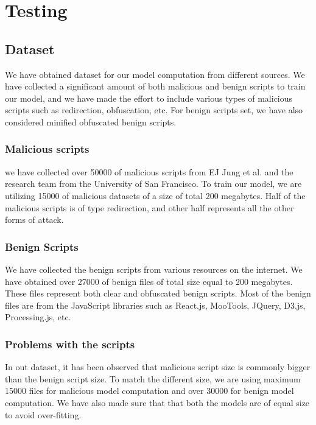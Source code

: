 \chapter{Testing}

\section{Dataset}

We have obtained dataset for our model computation from different sources. We have collected a significant amount of both malicious and benign scripts to train our model, and we have made the effort to include various types of malicious scripts such as redirection, obfuscation, etc. For benign scripts set, we have also considered minified obfuscated benign scripts.

\subsection{Malicious scripts}

we have collected over 50000 of malicious scripts from EJ Jung et al. and the research team from the University of San Francisco. To train our model, we are utilizing 15000 of malicious datasets of a size of total 200 megabytes. Half of the malicious scripts is of type redirection, and other half represents all the other forms of attack.

\subsection{Benign Scripts}

We have collected the benign scripts from various resources on the internet. We have obtained over 27000 of benign files of total size equal to 200 megabytes. These files represent both clear and obfuscated benign scripts. Most of the benign files are from the JavaScript libraries such as React.js, MooTools, JQuery, D3.js, Processing.js, etc.

\subsection{Problems with the scripts}

In out dataset, it has been observed that malicious script size is commonly bigger than the benign script size. To match the different size, we are using maximum 15000 files for malicious model computation and over 30000 for benign model computation. We have also made sure that that both the models are of equal size to avoid over-fitting. 

